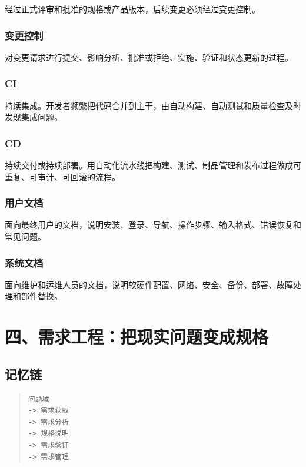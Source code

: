 \documentclass[UTF8,zihao=-4]{ctexart}
\begin{document}
经过正式评审和批准的规格或产品版本，后续变更必须经过变更控制。


\subsubsection*{变更控制}


对变更请求进行提交、影响分析、批准或拒绝、实施、验证和状态更新的过程。


\subsubsection*{CI}


持续集成。开发者频繁把代码合并到主干，由自动构建、自动测试和质量检查及时发现集成问题。


\subsubsection*{CD}


持续交付或持续部署。用自动化流水线把构建、测试、制品管理和发布过程做成可重复、可审计、可回滚的流程。


\subsubsection*{用户文档}


面向最终用户的文档，说明安装、登录、导航、操作步骤、输入格式、错误恢复和常见问题。


\subsubsection*{系统文档}


面向维护和运维人员的文档，说明软硬件配置、网络、安全、备份、部署、故障处理和部件替换。


\section{四、需求工程：把现实问题变成规格}


\subsection{记忆链}


\begin{quote}
\footnotesize
\begin{verbatim}
问题域
-> 需求获取
-> 需求分析
-> 规格说明
-> 需求验证
-> 需求管理
\end{verbatim}
\end{quote}
\end{document}

